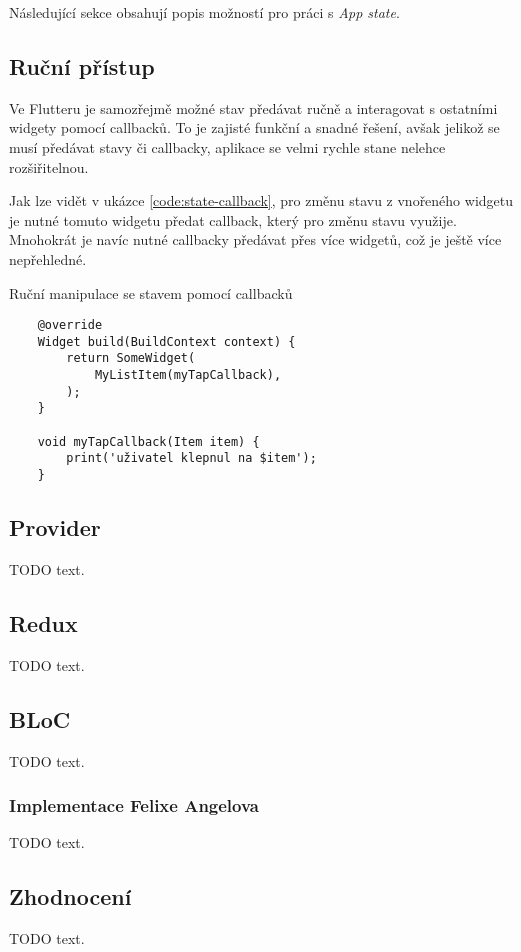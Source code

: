 Následující sekce obsahují popis možností pro práci s \emph{App state}.

\subsection{Ruční přístup}


Ve Flutteru je samozřejmě možné stav předávat ručně a interagovat s ostatními
widgety pomocí callbacků.
To je zajisté funkční a snadné řešení,
avšak jelikož se musí předávat stavy či callbacky,
aplikace se velmi rychle stane nelehce rozšiřitelnou.

Jak lze vidět v ukázce \ref{code:state-callback},
pro změnu stavu z vnořeného widgetu je nutné tomuto widgetu předat callback,
který pro změnu stavu využije.
Mnohokrát je navíc nutné callbacky předávat přes více widgetů,
což je ještě více nepřehledné.

\begin{listing}
    \caption{Ruční manipulace se stavem pomocí callbacků \cite{googleinc_2020_simple}}
    \label{code:state-callback}
    \begin{verbatim}
    @override
    Widget build(BuildContext context) {
        return SomeWidget(
            MyListItem(myTapCallback),
        );
    }

    void myTapCallback(Item item) {
        print('uživatel klepnul na $item');
    }
    \end{verbatim}
\end{listing}


\subsection{Provider}

TODO text.

\subsection{Redux}

TODO text.

\subsection{BLoC}

TODO text.


\subsubsection{Implementace Felixe Angelova}

TODO text.

\subsection{Zhodnocení}

TODO text.
